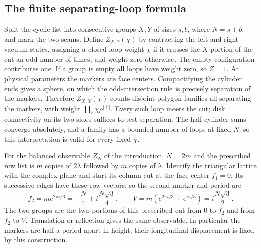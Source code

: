 \subsection{The finite separating-loop formula}

Split the cyclic list into consecutive groups $X,Y$ of sizes $s,b$,
where $N=s+b$, and mark the two seams. Define $Z_{X,Y}(\chi)$ by
contracting the left and right vacuum states, assigning a closed loop
weight $\chi$ if it crosses the $X$ portion of the cut an odd number
of times, and weight zero otherwise. The empty configuration contributes
one. If a group is empty all loops have weight zero, so $Z=1$.
At physical parameters the markers are face centers. Compactifying
the cylinder ends gives a sphere, on which the odd-intersection rule
is precisely separation of the markers. Therefore $Z_{X,Y}(\chi)$
counts disjoint polygon families all separating the markers, with
weight $\prod_\ell\chi\rho^{|\ell|}$. Every such loop meets the cut;
disk connectivity on its two sides suffices to test separation.
The half-cylinder sums converge absolutely, and a family has a
bounded number of loops at fixed $N$, so this interpretation is valid
for every fixed $\chi$.

For the balanced observable $Z_N$ of the introduction, $N=2m$ and
the prescribed row list is $m$ copies of $2\lambda$ followed by $m$
copies of $\lambda$. Identify the triangular lattice with the complex
plane and start its column cut at the face center $f_1=0$. Its successive
edges have these row vectors, so the second marker and period are
\[
 f_2=m e^{2\pi i/3}=-\frac N4+i\frac{N\sqrt3}{4},\qquad
 V=m(e^{2\pi i/3}+e^{\pi i/3})=i\frac{N\sqrt3}{2}.
\]
The two groups are the two portions of this prescribed cut from $0$
to $f_2$ and from $f_2$ to $V$. Translation or reflection gives the
same observable. In particular the markers are half a period apart in
height; their longitudinal displacement is fixed by this construction.

